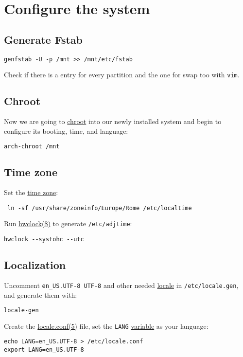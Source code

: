\documentclass[12pt,A4]{article}
\begin{document}
\section{Configure the system}

\subsection{Generate Fstab}
\begin{verbatim}
genfstab -U -p /mnt >> /mnt/etc/fstab
\end{verbatim}
Check if there is a entry for every partition and the one for swap too with \texttt{vim}.
\subsection{Chroot}
Now we are going to \href{https://wiki.archlinux.org/index.php/Change_root}{chroot} into our newly installed system and begin to configure its booting, time, and language:
\begin{verbatim}
arch-chroot /mnt
\end{verbatim}

\subsection{Time zone}
Set the \href{https://wiki.archlinux.org/index.php/Time_zone}{time zone}:
\begin{verbatim}
 ln -sf /usr/share/zoneinfo/Europe/Rome /etc/localtime
\end{verbatim}
Run \href{https://jlk.fjfi.cvut.cz/arch/manpages/man/hwclock.8}{hwclock(8)} to generate \texttt{/etc/adjtime}:
\begin{verbatim}
hwclock --systohc --utc
\end{verbatim}

\subsection{Localization}
Uncomment \texttt{en\_US.UTF-8 UTF-8} and other needed \href{https://wiki.archlinux.org/index.php/Locale}{locale} in \texttt{/etc/locale.gen}, and generate them with:
\begin{verbatim}
locale-gen
\end{verbatim}
Create the \href{https://jlk.fjfi.cvut.cz/arch/manpages/man/locale.conf.5}{locale.conf(5)} file, set the \texttt{LANG} \href{https://wiki.archlinux.org/index.php/Variable}{variable} as your language:
\begin{verbatim}
echo LANG=en_US.UTF-8 > /etc/locale.conf
export LANG=en_US.UTF-8
\end{verbatim}
\end{document}

